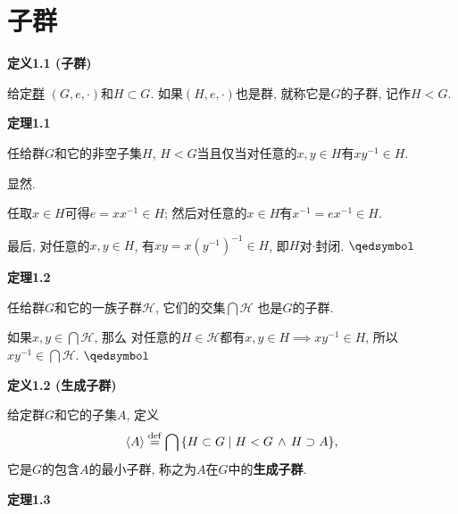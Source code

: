 \documentclass[UTF8]{ctexart}
\begin{document}
\setlength{\abovedisplayskip}{1pt}
\setlength{\belowdisplayskip}{1pt}

\section{子群}

\hypertarget{sec:定义1.1}{}
\noindent\textbf{定义1.1 (子群)}

给定\href{01 半群与群#nameddest=sec:定义2.1}{群} $(G,e,\cdot)$和$H\subset G$.
如果$(H,e,\cdot)$也是群, 就称它是$G$的子群, 记作$H<G$.

\vspace{10pt}

\hypertarget{sec:定理1.1}{}
\noindent\textbf{定理1.1}

任给群$G$和它的非空子集$H$, $H<G$当且仅当对任意的$x,y\in H$有$xy^{-1}\in H$.


 显然.


任取$x\in H$可得$e=xx^{-1}\in H$; 然后对任意的$x\in H$有$x^{-1}=ex^{-1}\in H$.

最后, 对任意的$x,y\in H$, 有$xy=x(y^{-1})^{-1}\in H$, 即$H$对$\cdot$封闭.
\hfill $\qedsymbol$

\vspace{10pt}

\hypertarget{sec:定理1.2}{}
\noindent\textbf{定理1.2}

任给群$G$和它的一族子群$\mathcal{H}$, 它们的交集$\displaystyle\bigcap\mathcal{H}$
也是$G$的子群.


如果$\displaystyle x,y\in\bigcap\mathcal{H}$, 那么
对任意的$H\in\mathcal{H}$都有$x,y\in H\implies xy^{-1}\in H$,
所以$\displaystyle xy^{-1}\in\bigcap\mathcal{H}$. \hfill $\qedsymbol$

\vspace{10pt}

\hypertarget{sec:定义1.2}{}
\noindent\textbf{定义1.2 (生成子群)}

给定群$G$和它的子集$A$, 定义
\[
    \langle A\rangle\overset{\mathrm{def}}{=}
    \bigcap\,\{H\subset G\mid H<G\,\land\,H\supset A\},\\[1pt]
\]
它是$G$的包含$A$的最小子群, 称之为$A$在$G$中的\textbf{生成子群}.

\vspace{10pt}

\hypertarget{sec:定理1.3}{}
\noindent\textbf{定理1.3}
\end{document}
